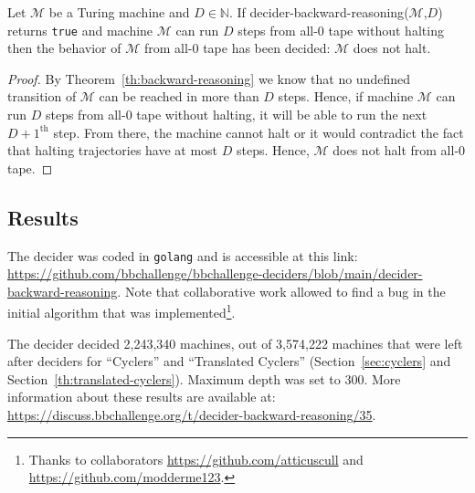 \begin{corollary}\normalfont
  Let $\mathcal{M}$ be a Turing machine and $D\in\mathbb{N}$. If {\sc decider-backward-reasoning}($\mathcal{M}$,$D$) returns \texttt{true} and machine $\mathcal{M}$ can run $D$ steps from all-0 tape without halting then the behavior of $\mathcal{M}$ from all-0 tape has been decided: $\mathcal{M}$ does not halt.
\end{corollary}
\begin{proof}
  By Theorem~\ref{th:backward-reasoning} we know that no undefined transition of $\mathcal{M}$ can be reached in more than $D$ steps. Hence, if machine $\mathcal{M}$ can run $D$ steps from all-0 tape without halting, it will be able to run the next $D+1^{\text{th}}$ step. From there, the machine cannot halt or it would contradict the fact that halting trajectories have at most $D$ steps. Hence, $\mathcal{M}$ does not halt from all-0 tape.
\end{proof}

\subsection{Results}

The decider was coded in \texttt{golang} and is accessible at this link: \url{https://github.com/bbchallenge/bbchallenge-deciders/blob/main/decider-backward-reasoning}. Note that collaborative work allowed to find a bug in the initial algorithm that was implemented\footnote{Thanks to collaborators \url{https://github.com/atticuscull} and \url{https://github.com/modderme123}.}.

The decider decided 2,243,340 machines, out of 3,574,222 machines that were left after deciders for ``Cyclers'' and ``Translated Cyclers'' (Section~\ref{sec:cyclers} and Section~\ref{th:translated-cyclers}). Maximum depth was set to 300. More information about these results are available at: \url{https://discuss.bbchallenge.org/t/decider-backward-reasoning/35}.
